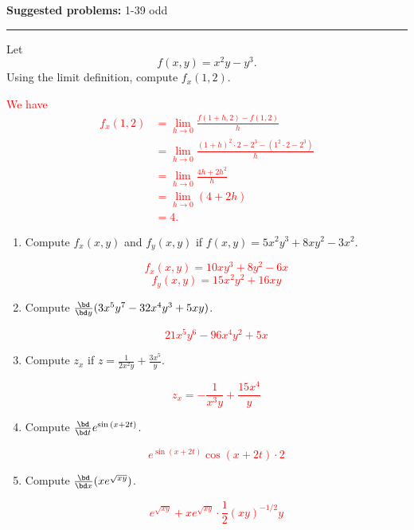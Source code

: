 \documentclass[12pt,reqno]{amsart}
\begin{document}
\textbf{Suggested problems:} 1-39 odd

\bigskip
\hrule

\bigskip

\prob Let
	\[f(x,y) = x^2y-y^3.
	\]
Using the limit definition, compute $f_x(1,2)$.

\medskip
\textcolor{red}{We have
\begin{align*}
f_x(1,2) &= \lim_{h\to 0} \frac{f(1+h,2)-f(1,2)}{h} \\
&= \lim_{h\to 0} \frac{ (1+h)^2\cdot 2 -2^3 -  ( 1^2\cdot 2 - 2^3)}{h} \\
&= \lim_{h\to 0} \frac{  4h +2h^2}{h} \\
&= \lim_{h\to 0} (4+2h) \\
&= 4.
\end{align*}}

\medskip
\prob 

\begin{enumerate}
\item Compute $f_x(x,y)$ and $f_y(x,y)$ if $f(x,y) = 5x^2y^3 + 8xy^2 -3x^2$.

\bigskip
\textcolor{red}{
	\[f_x(x,y) = 10xy^3 + 8y^2  -6x
	\]
	\[f_y(x,y) = 15x^2y^2 + 16xy
	\]}
\bigskip

\item Compute $\frac{\bd}{\bd y} ( 3x^5y^7 - 32x^4y^3 + 5xy)$.

\bigskip
\textcolor{red}{
	\[21x^5y^6 -96x^4y^2 +5x
	\]}
\bigskip

\item Compute $z_x$ if $z = \frac{1}{2x^2y} + \frac{3x^5 }{y}$.

\bigskip
\textcolor{red}{
	\[z_x = - \frac{1}{x^3y} + \frac{15x^4}{y}
	\]}
\bigskip

\item Compute $\frac{\bd}{\bd t} e^{\sin{(x+2t)}}$.

\bigskip
\textcolor{red}{
	\[e^{\sin{(x+2t)}} \cos{(x+2t)} \cdot 2
	\]}
\bigskip

\item Compute $\frac{\bd}{\bd x}( x e^{\sqrt{xy}})$.

\bigskip
\textcolor{red}{
	\[e^{\sqrt{xy}} + xe^{\sqrt{xy}}\cdot \frac{1}{2}(xy)^{-1/2}y
	\]}
\bigskip
\end{enumerate}

\prob
\end{document}
